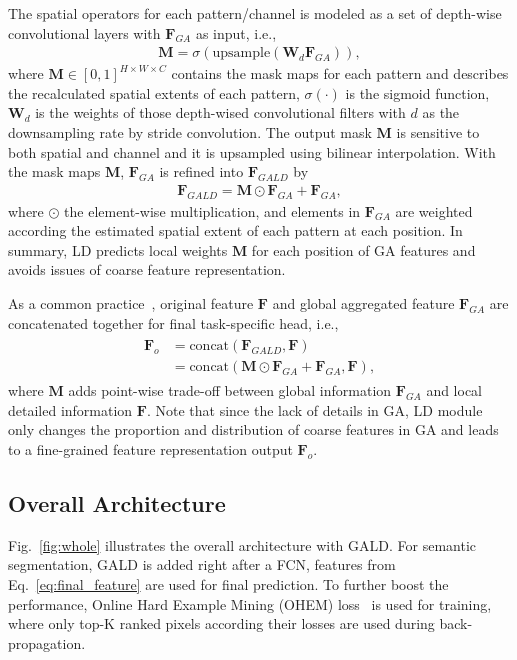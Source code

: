 \documentclass{bmvc2k}
\begin{document}
The spatial operators for each pattern/channel is modeled as a set of depth-wise convolutional layers with $\mathbf{F}_{GA}$ as input, i.e.,
\begin{align}
    \mathbf{M} = \sigma(\text{upsample}(\mathbf W_{d} \mathbf{F}_{GA})),
\end{align}
where $\mathbf{M} \in [0,1]^{H\times W \times C}$ contains the mask maps for each pattern and describes the recalculated spatial extents of each pattern, $\sigma(\cdot)$ is the sigmoid function, $\mathbf W_{d}$ is the weights of  those depth-wised convolutional filters with $d$ as the downsampling rate by stride convolution. The output mask $\mathbf{M}$ is sensitive to both spatial and channel and it is upsampled using bilinear interpolation. With the mask maps $\mathbf{M}$, $\mathbf{F}_{GA}$ is refined into $\mathbf{F}_{GALD}$ by
\begin{align}
    \mathbf{F}_{GALD} = \mathbf{M} \odot \mathbf{F}_{GA}  + \mathbf{F}_{GA},
\end{align}
where $\odot$ the element-wise multiplication, and elements in $\mathbf{F}_{GA}$ are weighted according the estimated spatial extent of each pattern at each position. In summary, LD predicts local weights $\mathbf{M}$ for each position of GA features
and avoids issues of coarse feature representation. 

As a common practice~\cite{pspnet}, original feature $\mathbf{F}$ and global aggregated feature $\mathbf{F}_{GA}$ are concatenated together for final task-specific head, i.e.,
\begin{align}
\begin{split}
    \mathbf{F}_{o} &= \text{concat}( \mathbf{F}_{GALD}, \mathbf{F}) \\
                   &= \text{concat}( \mathbf{M} \odot \mathbf{F}_{GA}  + \mathbf{F}_{GA},\mathbf{F} ),
\end{split}
\label{eq:final_feature}
\end{align}
where $\mathbf{M}$ adds point-wise trade-off between global information $\mathbf{F}_{GA}$ and local detailed information $\mathbf{F}$. Note that since the lack of details in GA, LD module only changes the proportion and distribution of coarse features in GA and leads to a fine-grained feature representation output $\mathbf{F}_{o}$.

\subsection{Overall Architecture}
Fig.~\ref{fig:whole} illustrates the overall architecture with GALD. For semantic segmentation, GALD is added right after a FCN, features from Eq.~\ref{eq:final_feature} are used for final prediction. To further boost the performance, Online Hard Example Mining (OHEM) loss~\cite{SegOHEM} is used for training, where only top-K ranked pixels according their losses are used during back-propagation.
\end{document}
